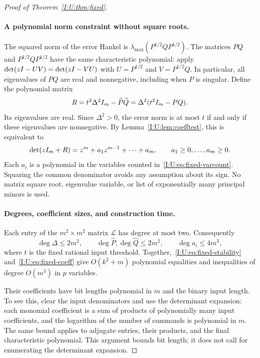 \begin{proof}[Proof of Theorem~\ref{I:U:thm:fixed}]
\paragraph{A polynomial norm constraint without square roots.}
The squared norm of the error Hankel is
$\lambda_{\max}(P^{1/2}QP^{1/2})$.
The matrices $PQ$ and $P^{1/2}QP^{1/2}$ have the same characteristic
polynomial: apply
$\det(zI-UV)=\det(zI-VU)$ with
$U=P^{1/2}$ and $V=P^{1/2}Q$.
In particular, all eigenvalues of $PQ$ are real and nonnegative,
including when $P$ is singular.
Define the polynomial matrix
\begin{equation}\label{I:U:eq:fixed-R}
 R=t^2\Delta^2I_m-\widehat P\widehat Q
   =\Delta^2(t^2I_m-PQ).
\end{equation}
Its eigenvalues are real.  Since $\Delta^2>0$, the error norm is at
most $t$ if and only if these eigenvalues are nonnegative.  By
Lemma~\ref{I:U:lem:coefftest}, this is equivalent to
\begin{equation}\label{I:U:eq:fixed-coeff}
 \det(zI_m+R)=z^m+a_1z^{m-1}+\cdots+a_m,
 \qquad a_1\ge0,\ldots,a_m\ge0.
\end{equation}
Each $a_i$ is a polynomial in the variables counted
in~\eqref{I:U:eq:fixed-varcount}.  Squaring the common denominator avoids
any assumption about its sign.  No matrix square root, eigenvalue
variable, or list of exponentially many principal minors is used.

\paragraph{Degrees, coefficient sizes, and construction time.}
Each entry of the $m^2\times m^2$ matrix $\mathcal L$ has degree at most two.
Consequently
\[
 \deg\Delta\le2m^2,\qquad
 \deg\widehat P,\deg\widehat Q\le2m^2,\qquad
 \deg a_i\le4m^3,
\]
where $t$ is the fixed rational input threshold.
Together,~\eqref{I:U:eq:fixed-stability} and~\eqref{I:U:eq:fixed-coeff}
give $O(k^2+m)$ polynomial equalities and inequalities of degree
$O(m^3)$ in $p$ variables.

Their coefficients have bit lengths polynomial in $m$ and the binary
input length.  To see this, clear the input denominators and use the
determinant expansion: each monomial coefficient is a sum of products
of polynomially many input coefficients, and the logarithm of the
number of summands is polynomial in $m$.  The same bound applies to
adjugate entries, their products, and the final characteristic
polynomial.  This argument bounds bit length; it does not call for
enumerating the determinant expansion.


\end{proof}
